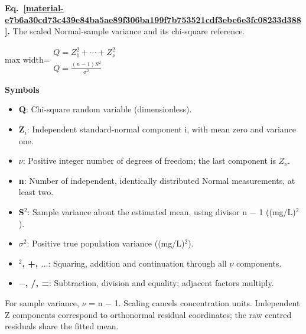 \documentclass[11pt,a4paper]{article}
\begin{document}
\par\medskip
\begin{samepage}
\label{material-e7b6a30cd73c439e84ba5ae89f306ba199f7b753521cdf3ebe6e3fc08233d388}
\noindent\textbf{Eq.~\ref*{material-e7b6a30cd73c439e84ba5ae89f306ba199f7b753521cdf3ebe6e3fc08233d388}.} The scaled Normal-sample variance and its chi-square reference.\par\nopagebreak
\begin{center}\begin{adjustbox}{max width=\linewidth}$\displaystyle \begin{gathered}Q=Z_1^2+\cdots+Z_\nu^2\\Q=\frac{(n-1)S^2}{\sigma^2}\end{gathered}$\end{adjustbox}\end{center}

\par\noindent\textbf{Symbols}

\begin{itemize}\setlength{\itemsep}{1pt}\setlength{\parsep}{0pt}
\item \textbf{Q}: Chi-square random variable (dimensionless).
\item \textbf{Z\ensuremath{{}_i}}: Independent standard-normal component i, with mean zero and variance one.
\item \textbf{\(ν\)}: Positive integer number of degrees of freedom; the last component is \(Z_ν\).
\item \textbf{n}: Number of independent, identically distributed Normal measurements, at least two.
\item \textbf{S\ensuremath{{}^2}}: Sample variance about the estimated mean, using divisor n \ensuremath{-} 1 ((mg/L)\ensuremath{{}^2}).
\item \textbf{\ensuremath{\sigma}\ensuremath{{}^2}}: Positive true population variance ((mg/L)\ensuremath{{}^2}).
\item \textbf{\ensuremath{{}^2}, +, \ensuremath{\ldots}}: Squaring, addition and continuation through all \ensuremath{\nu} components.
\item \textbf{\ensuremath{-}, /, =}: Subtraction, division and equality; adjacent factors multiply.
\end{itemize}

For sample variance, \ensuremath{\nu} = n \ensuremath{-} 1. Scaling cancels concentration units. Independent Z components correspond to orthonormal residual coordinates; the raw centred residuals share the fitted mean.

\end{samepage}
\medskip
\end{document}
